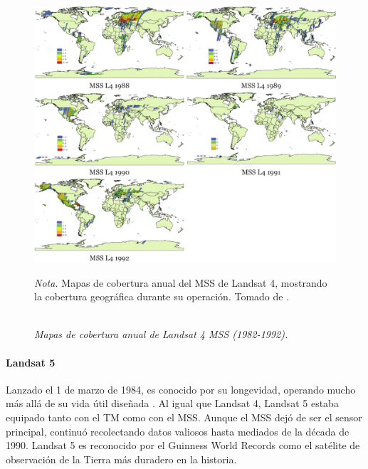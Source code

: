                     \begin{figure}[H] 
                        \caption{\doublespacing \\ \textit{Mapas de cobertura anual de Landsat 4 MSS (1982-1992).}} 
                        \centering
                        \includegraphics[width=1\linewidth]{2_CAPITULO2/IMG/landsat4.png}
                        \begin{justify}
                            \textit{Nota.} Mapas de cobertura anual del MSS de Landsat 4, mostrando la cobertura geográfica durante su operación. Tomado de \textcite{landsat_legacy}.
                        \end{justify}                    
                        \label{landsat4}
                    \end{figure}

                \paragraph{Landsat 5}
                    Lanzado el 1 de marzo de 1984, es conocido por su longevidad, operando mucho más allá de su vida útil diseñada . Al igual que Landsat 4, Landsat 5 estaba equipado tanto con el TM como con el MSS. Aunque el MSS dejó de ser el sensor principal, continuó recolectando datos valiosos hasta mediados de la década de 1990. Landsat 5 es reconocido por el Guinness World Records como el satélite de observación de la Tierra más duradero en la historia.

